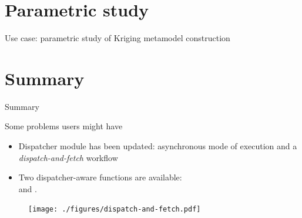 \documentclass[]{rsuqbeamernew}
\begin{document}
\section{Parametric study}
\begin{frame}[fragile]{Use case: parametric study of Kriging metamodel construction}
\end{frame}

\section{Summary}
\begin{frame}[fragile]{Summary}
\end{frame}


\begin{frame}{Some problems users might have}

  \begin{itemize}
    \item Dispatcher module has been updated: asynchronous mode of execution and 
          a \emph{dispatch-and-fetch} workflow
    \item Two dispatcher-aware functions are available:\\
           and .
  \end{itemize}
  
  \begin{figure}
    \centering
    \texttt{[image: ./figures/dispatch-and-fetch.pdf]}
  \end{figure}
  
  \end{frame}
  
\end{document}
